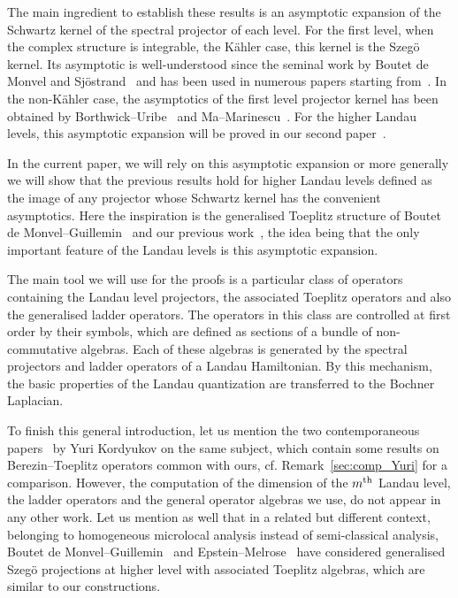 The main ingredient to establish these results is an asymptotic expansion of the Schwartz kernel of the spectral projector of each level. For the first level, when the complex structure is integrable, the K\"ahler case, this kernel is the Szeg\"o kernel. Its asymptotic is well-understood since the seminal work by Boutet de Monvel and Sj\"ostrand~\cite{BoSj} and has been used in numerous papers starting from~\cite{BoGu,BoMeSc,Ze}. In the non-K\"ahler case, the asymptotics of the first level projector kernel has been obtained by Borthwick--Uribe~\cite{BoUr07} and Ma--Marinescu~\cite{MaMa08}. For the higher Landau levels, this asymptotic expansion will be proved in our second paper~\cite{oim_copain}.

In the current paper, we will rely on this asymptotic expansion or more generally we will show that the previous results hold for higher Landau levels defined as the image of any projector whose Schwartz kernel has the convenient asymptotics. Here the inspiration is the generalised Toeplitz structure of Boutet de Monvel--Guillemin~\cite{BoGu} and our previous work~\cite{oim}, the idea being that the only important feature of the Landau levels is this asymptotic expansion.

The main tool we will use for the proofs is a particular class of operators containing the Landau level projectors, the associated Toeplitz operators and also the generalised ladder operators. The operators in this class are controlled at first order by their symbols, which are defined as sections of a bundle of non-commutative algebras. Each of these algebras is generated by the spectral projectors and ladder operators of a Landau Hamiltonian. By this mechanism, the basic properties of the Landau quantization are transferred to the Bochner Laplacian.


To finish this general introduction, let us mention the two contemporaneous papers~\cite{Yuri_1,Yuri_2} by Yuri Kordyukov on the same subject,  which contain some results on Berezin--Toeplitz operators common with ours, cf. Remark~\ref{sec:comp_Yuri} for a comparison. However, the computation of the dimension of the $m^{\rm th}$ Landau level, the ladder operators and the general operator algebras we use, do not appear in any other work.  Let us mention as well that in a related but different context, belonging to homogeneous microlocal analysis instead of semi-classical analysis, Boutet de Monvel--Guillemin~\cite[Chapter~15]{BoGu} and Epstein--Melrose~\cite[Chapter~6]{EM} have considered generalised Szeg\"o projections at higher level with associated Toeplitz algebras, which are similar to our constructions.


